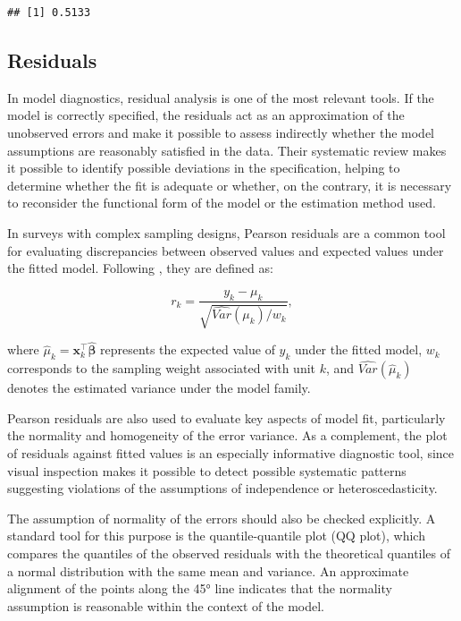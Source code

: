 \documentclass[
  english,
  12pt,
]{book}
\begin{document}
\begin{verbatim}
## [1] 0.5133
\end{verbatim}

\subsection{Residuals}\label{residuales}

In model diagnostics, residual analysis is one of the most relevant tools. If the model is correctly specified, the residuals act as an approximation of the unobserved errors and make it possible to assess indirectly whether the model assumptions are reasonably satisfied in the data. Their systematic review makes it possible to identify possible deviations in the specification, helping to determine whether the fit is adequate or whether, on the contrary, it is necessary to reconsider the functional form of the model or the estimation method used.

In surveys with complex sampling designs, Pearson residuals are a common tool for evaluating discrepancies between observed values and expected values under the fitted model. Following \citet{heeringa2017applied}, they are defined as:

\[
r_{k} = \frac{y_k - \mu_k}{\sqrt{\widehat{Var}(\mu_k)/w_k}},
\]

where \(\hat{\mu}_{k} = \mathbf{x}_{k}^{\top}\hat{\boldsymbol{\beta}}\) represents the expected value of \(y_{k}\) under the fitted model, \(w_{k}\) corresponds to the sampling weight associated with unit \(k\), and \(\widehat{Var}(\hat{\mu}_{k})\) denotes the estimated variance under the model family.

Pearson residuals are also used to evaluate key aspects of model fit, particularly the normality and homogeneity of the error variance. As a complement, the plot of residuals against fitted values is an especially informative diagnostic tool, since visual inspection makes it possible to detect possible systematic patterns suggesting violations of the assumptions of independence or heteroscedasticity.

The assumption of normality of the errors should also be checked explicitly. A standard tool for this purpose is the quantile-quantile plot (QQ plot), which compares the quantiles of the observed residuals with the theoretical quantiles of a normal distribution with the same mean and variance. An approximate alignment of the points along the 45° line indicates that the normality assumption is reasonable within the context of the model.
\end{document}
